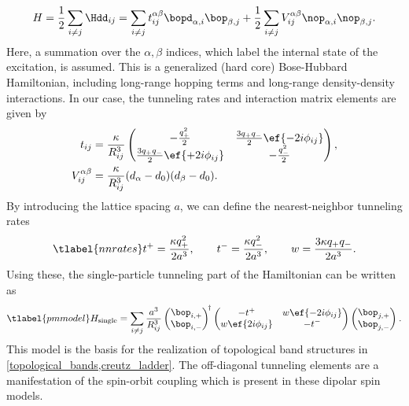 \begin{align}
    H = \frac{1}{2} \sum_{i\ne j} \Hdd_{ij} = \sum_{i\ne j}  t_{ij}^{\alpha\beta} \bopd_{\alpha,i} \bop_{\beta,j}
    +\frac{1}{2}\sum_{i\ne j} V_{ij}^{\alpha\beta} \nop_{\alpha,i} \nop_{\beta,j}.
\end{align}
Here, a summation over the $\alpha, \beta$ indices, which label the internal state of the excitation, is assumed. This is a generalized (hard core) Bose-Hubbard Hamiltonian, including long-range hopping terms and long-range density-density interactions. In our case, the tunneling rates and interaction matrix elements are given by
\begin{align}
    t_{ij} &= \frac{\kappa}{R_{ij}^3} \begin{pmatrix}
    -\frac{q_+^2}{2} & \frac{3q_+q_-}{2} \ef{-2i \phi_{ij}} \\
    \frac{3q_+q_-}{2} \ef{+2i \phi_{ij}} & -\frac{q_-^2}{2}
\end{pmatrix}, \\
    V_{ij}^{\alpha\beta} &= \frac{\kappa}{R_{ij}^3} (d_\alpha-d_0)(d_\beta-d_0).
\end{align}
By introducing the lattice spacing $a$, we can define the nearest-neighbor tunneling rates
\begin{align} \tlabel{nnrates}
    t^+ = \frac{\kappa q_{+}^2}{2a^3},\qquad
    t^- = \frac{\kappa q_{-}^2}{2a^3},\qquad
    w = \frac{3 \kappa q_{+}q_{-}}{2a^3}.
\end{align}
Using these, the single-particle tunneling part of the Hamiltonian can be written as
\begin{align} \tlabel{pmmodel}
    H_\text{single} = \sum_{i\ne j} \frac{a^3}{R_{ij}^3}
    \begin{pmatrix}
        \bop_{i,+} \\
        \bop_{i,-}
    \end{pmatrix}^{\!\dag}
    \begin{pmatrix}
        -t^+ & w \ef{-2i \phi_{ij}} \\
        w \ef{2i \phi_{ij}} & -t^- \\
    \end{pmatrix}
    \begin{pmatrix}
        \bop_{j,+} \\
        \bop_{j,-}
    \end{pmatrix}^{\vphantom\dag}.
\end{align}
This model is the basis for the realization of topological band structures in \cref{topological_bands,creutz_ladder}. The off-diagonal tunneling elements are a manifestation of the spin-orbit coupling which is present in these dipolar spin models.



